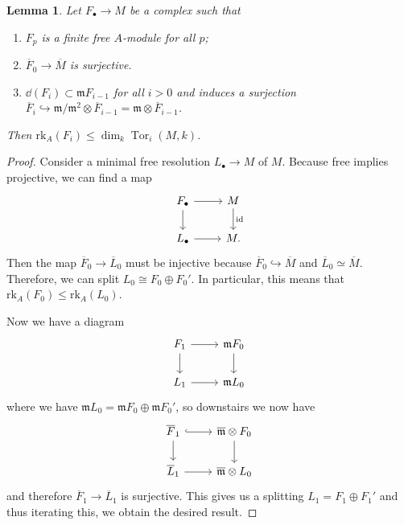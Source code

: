 \documentclass[leqno, openany]{memoir}
\newtheorem{lem}[thm]{Lemma}
\theoremstyle{definition}
\theoremstyle{remark}
\theoremstyle{plain}
\theoremstyle{definition}
\theoremstyle{remark}
\newcommand{\mf}[1]{\mathfrak{#1}}
\newcommand{\mr}[1]{\mathrm{#1}}
\newcommand{\ol}[1]{\overline{#1}}
\DeclareMathOperator{\Tor}{Tor}
\begin{document}
\begin{lem} Let $F_{\bullet} \to M$ be a complex such that \begin{enumerate}
    \item $F_p$ is a finite free $A$-module for all $p$; \item $\ol{F}_0 \to
        \ol{M}$ is surjective.  \item $\dd{(F_i)} \subset \mf{m} F_{i-1}$ for
        all $i > 0$ and induces a surjection $\ol{F}_i \hookrightarrow \mf{m} /
        \mf{m}^2 \otimes \ol{F}_{i-1} = \mf{m} \otimes \ol{F}_{i-1}$.
\end{enumerate} Then $\mr{rk}_A(F_i) \leq \dim_k \Tor_i(M, k)$.  \end{lem}

\begin{proof} Consider a minimal free resolution $L_{\bullet} \to M$ of $M$.
    Because free implies projective, we can find a map \begin{equation*}
        \begin{tikzcd} F_{\bullet} \arrow{r} \arrow{d} & M \arrow{d}{\mr{id}}
            \\ L_{\bullet} \arrow{r} & M.  \end{tikzcd} \end{equation*} Then
            the map $\ol{F}_0 \to \ol{L}_0$ must be injective because $\ol{F}_0
            \hookrightarrow \ol{M}$ and $\ol{L}_0 \simeq \ol{M}$. Therefore, we
            can split $L_0 \cong F_0 \oplus F_0'$. In particular, this means
            that $\mr{rk}_A(F_0) \leq \mr{rk}_A(L_0)$.

    Now we have a diagram \begin{equation*} \begin{tikzcd} F_1 \arrow{r}
    \arrow{d} & \mf{m} F_0 \arrow{d} \\ L_1 \arrow{r} & \mf{m} L_0 \end{tikzcd}
        \end{equation*} where we have $\mf{m}L_0 = \mf{m} F_0 \oplus \mf{m}
        F_0'$, so downstairs we now have \begin{equation*} \begin{tikzcd}
        \ol{F}_1 \arrow[hookrightarrow]{r} \arrow{d} & \ol{\mf{m}} \otimes F_0
    \arrow{d} \\ \ol{L}_1 \arrow{r} & \ol{\mf{m}} \otimes L_0 \end{tikzcd}
\end{equation*} and therefore $\ol{F}_1 \to \ol{L}_1$ is surjective. This gives
us a splitting $L_1 = F_1 \oplus F_1'$ and thus iterating this, we obtain the
desired result.  \end{proof}
\end{document}
